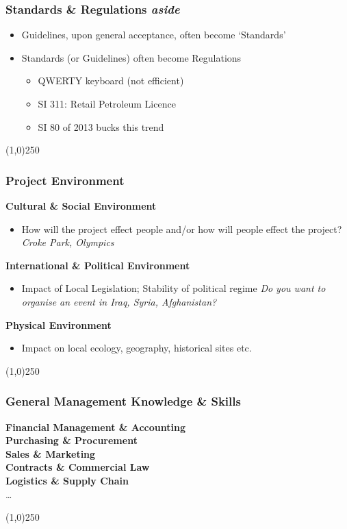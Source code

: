 \begin{frame}
\frametitle{Standards \& Regulations \hfill \textit{aside}}
\begin{itemize}
\item Guidelines, upon general acceptance, often become `Standards'
\item Standards (or Guidelines) often become Regulations
		\begin{itemize}
		\item QWERTY keyboard (not efficient)
		\item SI 311: Retail Petroleum Licence
		\item SI 80 of 2013 bucks this trend
		\end{itemize}
\end{itemize}
\end{frame}
\begin{center}\line(1,0){250}\end{center}



\begin{frame}
\frametitle{Project Environment}
\textbf{Cultural \& Social Environment}\\
\begin{itemize}
	\item How will the project effect people and/or how will people effect the project? \textit{Croke Park, Olympics}
\end{itemize}
\textbf{International \& Political Environment}\\
\begin{itemize}
	\item Impact of Local Legislation; Stability of political regime \textit{Do you want to organise an event in Iraq, Syria, Afghanistan?}
\end{itemize}
\textbf{Physical Environment }\\
\begin{itemize}
	\item Impact on local ecology, geography, historical sites etc. 
\end{itemize}
\end{frame}
\begin{center}\line(1,0){250}\end{center}



\begin{frame}
\frametitle{General Management Knowledge \& Skills}
\textbf{Financial Management \& Accounting}\\
\textbf{Purchasing \& Procurement}\\
\textbf{Sales \& Marketing}\\
\textbf{Contracts \& Commercial Law}\\
\textbf{Logistics \& Supply Chain}\\
\ldots 
\end{frame}
\begin{center}\line(1,0){250}\end{center}



